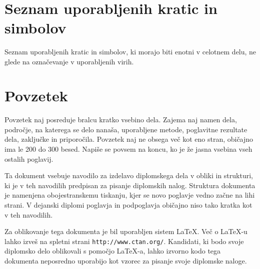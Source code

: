 \documentclass[12pt,a4paper]{book}
\begin{document}
\newpage


\ \thispagestyle{empty}

\newpage


\renewcommand\thepage{} 
\tableofcontents 
\renewcommand\thepage{\arabic{page}}

\thispagestyle{empty}



\chapter*{Seznam uporabljenih kratic in simbolov}

\thispagestyle{empty}

Seznam uporabljenih kratic in simbolov, ki morajo biti enotni v celotnem delu, ne glede na označevanje v uporabljenih virih.


\clearpage{\pagestyle{empty}\cleardoublepage}


\setcounter{page}{1}

\chapter*{Povzetek}

Povzetek naj posreduje bralcu kratko vsebino dela. Zajema naj namen dela, področje, na katerega se delo nanaša,
uporabljene metode, poglavitne rezultate dela, zaključke in priporočila. 
Povzetek naj ne obsega več kot eno stran, obi\v cajno ima le 200 do 300 besed. Napiše se povsem na koncu,
ko je že jasna vsebina vseh ostalih poglavij.

Ta dokument vsebuje navodilo za izdelavo diplomskega dela v obliki in strukturi, ki je v teh navodilih predpisan za
pisanje diplomskih nalog. Struktura dokumenta je namenjena obojestranskemu tiskanju, kjer se novo poglavje vedno za\v cne na lihi strani.
V dejanski diplomi poglavja in podpogla\-vja  obi\v cajno niso tako kratka kot v teh navodilih.

Za oblikovanje tega dokumenta je bil uporabljen sistem \LaTeX.
Ve\v c o \LaTeX-u lahko izve\v s na spletni strani \texttt{http://www.ctan.org/}.
Kandidati, ki bodo svoje diplomsko delo oblikovali s pomo\v cjo
\LaTeX-a, lahko izvorno kodo tega dokumenta neposredno uporabijo kot vzorec za pisanje svoje diplomske naloge.
\end{document}

